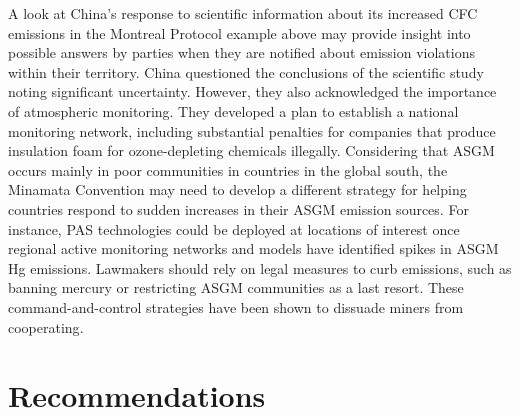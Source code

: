 \begin{flushleft}
A look at China's response to scientific information about its increased CFC emissions in the Montreal Protocol example above may provide insight into possible answers by parties when they are notified about emission violations within their territory. China questioned the conclusions of the scientific study noting significant uncertainty. However, they also acknowledged the importance of atmospheric monitoring. They developed a plan to establish a national monitoring network, including substantial penalties for companies that produce insulation foam for ozone-depleting chemicals illegally. Considering that ASGM occurs mainly in poor communities in countries in the global south, the Minamata Convention may need to develop a different strategy for helping countries respond to sudden increases in their ASGM emission sources. For instance, PAS technologies could be deployed at locations of interest once regional active monitoring networks and models have identified spikes in ASGM Hg emissions. Lawmakers should rely on legal measures to curb emissions, such as banning mercury or restricting ASGM communities as a last resort. These command-and-control strategies have been shown to dissuade miners from cooperating\cite{konkel_safer_nodate,giuliani_technical_2022}.
\end{flushleft}




\section{Recommendations}\label{c4_recommendations}


